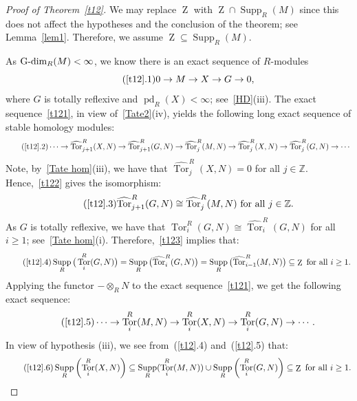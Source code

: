 \documentclass[11pt]{amsart}
\theoremstyle{definition}
\theoremstyle{definition}
\numberwithin{equation}{section}
\newcommand{\ZZ}{\mathbb{Z}}
\DeclareMathOperator{\Gdim}{\textnormal{G-dim}}
\DeclareMathOperator{\mz}{Z}
\DeclareMathOperator{\pd}{pd}
\DeclareMathOperator{\Supp}{Supp}
\DeclareMathOperator{\Tor}{Tor}
\begin{document}
\begin{proof}[Proof of Theorem~\ref{t12}] We may replace $\mz$ with $\mz\cap\Supp_R(M)$ since this does not affect the hypotheses and the conclusion of the theorem; see Lemma~\ref{lem1}. Therefore, we assume $\mz\subseteq\Supp_R(M)$. 

As $\Gdim_R(M)<\infty$, we know there is an exact sequence of $R$-modules
\begin{equation}\label{t121}\tag{\ref*{t12}.1}
0\rightarrow M\rightarrow X\rightarrow G\rightarrow0,
\end{equation}
where $G$ is totally reflexive and $\pd_R(X)<\infty$; see~\ref{HD}(iii). The exact sequence~\eqref{t121}, in view of~\ref{Tate2}(iv), yields the following long exact sequence of stable homology modules:
\begin{equation}\label{t122}\tag{\ref*{t12}.2}
\cdots \rightarrow \widehat{\Tor}_{j+1}^R(X,N) \rightarrow\widehat{\Tor}_{j+1}^R(G,N)\rightarrow\widehat{\Tor}_{j}^R(M,N)\rightarrow\widehat{\Tor}_{j}
^R(X,N)\rightarrow
\widehat{\Tor}_{j}^R(G,N)\rightarrow\cdots
\end{equation}
Note, by~\ref{Tate hom}(iii), we have that $\widehat{\Tor}_{j}^R(X,N)=0$ for all $j\in\ZZ$. Hence,~\eqref{t122} gives the isomorphism:
\begin{equation}\label{t123}\tag{\ref*{t12}.3}
\widehat{\Tor}_{j+1}^R(G,N)\cong\widehat{\Tor}_{j}^R(M,N) \text{ for all } j\in\ZZ.
\end{equation}
As $G$ is totally reflexive, we have that $\Tor_i^R(G,N) \cong \widehat{\Tor}_i^R(G,N)$ for all $i\geq 1$; see~\ref{Tate hom}(i). Therefore,~\eqref{t123} implies that:
\begin{equation}\label{t124}\tag{\ref*{t12}.4}
\Supp_R\big(\Tor_i^R(G,N)\big)=\Supp_R\big(\widehat{\Tor}_i^R(G,N)\big)=\Supp_R\big(\widehat{\Tor}_{i-1}^R(M,N)\big)\subseteq\mz \text{ for all } i\geq 1.
\end{equation}
Applying the functor $-\otimes_RN$ to the exact sequence~\eqref{t121}, we get the following exact sequence:
\begin{equation}\label{t125}\tag{\ref*{t12}.5}
\cdots\rightarrow\Tor_i^R(M,N)\to\Tor_i^R(X,N)\to\Tor_i^R(G,N)\rightarrow\cdots.
\end{equation}
In view of hypothesis (iii), we see from~(\ref{t12}.4) and~(\ref{t12}.5) that: 
\begin{equation}\label{t126}\tag{\ref*{t12}.6}
\Supp_R\left(\Tor_i^R(X,N)\right)\subseteq\Supp_R(\Tor_i^R(M,N))\cup\Supp_R\left(\Tor_i^R(G,N)\right)\subseteq\mz \text{ for all } i\geq 1.
\end{equation}


\end{proof}
\end{document}
